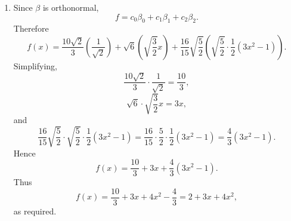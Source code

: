 \documentclass[12pt]{article}
\newcommand{\ip}[2]{\left\langle #1,#2\right\rangle}
\begin{document}
\begin{enumerate}[label=(\alph*)]
  First,
  \[
    c_0
    =
    \ip{\frac1{\sqrt2}}{2+3x+4x^2}
    =
    \frac1{\sqrt2}\int_{-1}^{1}(2+3x+4x^2)\,dx.
  \]
  Using
  \[
    \int_{-1}^{1}1\,dx=2,
    \qquad
    \int_{-1}^{1}x\,dx=0,
    \qquad
    \int_{-1}^{1}x^2\,dx=\frac23,
  \]
  we get
  \[
    c_0
    =
    \frac1{\sqrt2}\left(2\cdot2+3\cdot0+4\cdot\frac23\right)
    =
    \frac1{\sqrt2}\left(4+\frac83\right)
    =
    \frac{20}{3\sqrt2}.
  \]
  Equivalently,
  \[
    \boxed{c_0=\frac{10\sqrt2}{3}.}
  \]

  Next,
  \[
    c_1
    =
    \ip{\sqrt{\frac32}x}{2+3x+4x^2}
    =
    \sqrt{\frac32}\int_{-1}^{1}x(2+3x+4x^2)\,dx.
  \]
  Hence
  \[
    c_1
    =
    \sqrt{\frac32}\int_{-1}^{1}(2x+3x^2+4x^3)\,dx.
  \]
  The odd terms integrate to $0$, so
  \[
    c_1
    =
    \sqrt{\frac32}\left(3\cdot\frac23\right)
    =
    2\sqrt{\frac32}.
  \]
  Therefore
  \[
    \boxed{c_1=\sqrt6.}
  \]

  Finally,
  \[
    c_2
    =
    \ip{\sqrt{\frac52}\cdot\frac12(3x^2-1)}{2+3x+4x^2}.
  \]
  Thus
  \[
    c_2
    =
    \sqrt{\frac52}\int_{-1}^{1}
    \frac12(3x^2-1)(2+3x+4x^2)\,dx.
  \]
  Since $P_2$ is orthogonal to constants and to $x$, only the $4x^2$ term contributes:
  \[
    c_2
    =
    \sqrt{\frac52}\int_{-1}^{1}
    \frac12(3x^2-1)(4x^2)\,dx.
  \]
  So
  \[
    c_2
    =
    \sqrt{\frac52}\cdot 2\int_{-1}^{1}(3x^4-x^2)\,dx.
  \]
  Using
  \[
    \int_{-1}^{1}x^4\,dx=\frac25,
    \qquad
    \int_{-1}^{1}x^2\,dx=\frac23,
  \]
  we get
  \[
    c_2
    =
    \sqrt{\frac52}\cdot 2\left(3\cdot\frac25-\frac23\right)
    =
    \sqrt{\frac52}\cdot 2\left(\frac65-\frac23\right).
  \]
  Since
  \[
    \frac65-\frac23=\frac{18-10}{15}=\frac8{15},
  \]
  we obtain
  \[
    c_2
    =
    \sqrt{\frac52}\cdot\frac{16}{15}.
  \]
  Therefore
  \[
    \boxed{c_2=\frac{16}{15}\sqrt{\frac52}.}
  \]

  Hence the $\beta$-Fourier coefficients are
  \[
    \boxed{
    (c_0,c_1,c_2)
    =
    \left(
    \frac{10\sqrt2}{3},
    \sqrt6,
    \frac{16}{15}\sqrt{\frac52}
    \right).}
  \]

  \item Since $\beta$ is orthonormal,
  \[
    f=c_0\beta_0+c_1\beta_1+c_2\beta_2.
  \]
  Therefore
  \[
    \boxed{
    f(x)
    =
    \frac{10\sqrt2}{3}\left(\frac1{\sqrt2}\right)
    +
    \sqrt6\left(\sqrt{\frac32}x\right)
    +
    \frac{16}{15}\sqrt{\frac52}
    \left(\sqrt{\frac52}\cdot\frac12(3x^2-1)\right).}
  \]
  Simplifying,
  \[
    \frac{10\sqrt2}{3}\cdot\frac1{\sqrt2}
    =
    \frac{10}{3},
  \]
  \[
    \sqrt6\cdot\sqrt{\frac32}x
    =
    3x,
  \]
  and
  \[
    \frac{16}{15}\sqrt{\frac52}\cdot\sqrt{\frac52}\cdot\frac12(3x^2-1)
    =
    \frac{16}{15}\cdot\frac52\cdot\frac12(3x^2-1)
    =
    \frac43(3x^2-1).
  \]
  Hence
  \[
    f(x)
    =
    \frac{10}{3}+3x+\frac43(3x^2-1).
  \]
  Thus
  \[
    f(x)
    =
    \frac{10}{3}+3x+4x^2-\frac43
    =
    2+3x+4x^2,
  \]
  as required.
\end{enumerate}
\end{document}
